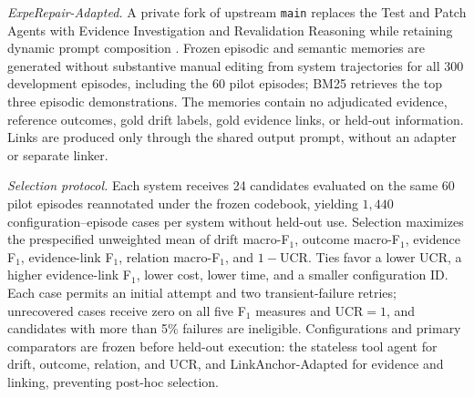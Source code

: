 \documentclass[10pt,conference]{IEEEtran}
\begin{document}
\par\noindent\textit{ExpeRepair-Adapted.} A private fork of upstream \texttt{main} replaces the Test and Patch Agents with Evidence Investigation and Revalidation Reasoning while retaining dynamic prompt composition \cite{Mu2026ExpeRepair}. Frozen episodic and semantic memories are generated without substantive manual editing from system trajectories for all 300 development episodes, including the 60 pilot episodes; BM25 retrieves the top three episodic demonstrations. The memories contain no adjudicated evidence, reference outcomes, gold drift labels, gold evidence links, or held-out information. Links are produced only through the shared output prompt, without an adapter or separate linker. \par\noindent\textit{Selection protocol.} Each system receives 24 candidates evaluated on the same 60 pilot episodes reannotated under the frozen codebook, yielding $1{,}440$ configuration--episode cases per system without held-out use. Selection maximizes the prespecified unweighted mean of drift macro-F$_1$, outcome macro-F$_1$, evidence F$_1$, evidence-link F$_1$, relation macro-F$_1$, and $1-\mathrm{UCR}$. Ties favor a lower UCR, a higher evidence-link F$_1$, lower cost, lower time, and a smaller configuration ID. Each case permits an initial attempt and two transient-failure retries; unrecovered cases receive zero on all five F$_1$ measures and UCR$=1$, and candidates with more than 5\% failures are ineligible. Configurations and primary comparators are frozen before held-out execution: the stateless tool agent for drift, outcome, relation, and UCR, and LinkAnchor-Adapted for evidence and linking, preventing post-hoc selection.
\end{document}
